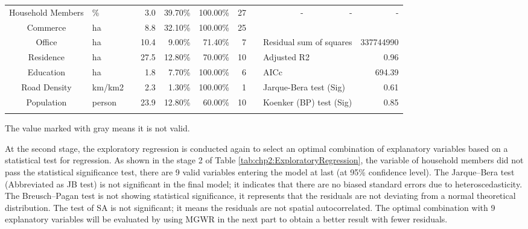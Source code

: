 \begin{sidewaystable}[htbp]
\begin{tabular}{clrrrrrcrrr}
		Household Members & \% & & 3.0 & 39.70\% & 100.00\% & 27 & & - & - & - \\
		
		\cmidrule{1-2}\cmidrule{4-7}\cmidrule{9-11}
		
		Commerce & ha & & \cellcolor[rgb]{ .8,  .8,  .8}8.8 & 32.10\% & 100.00\% & 25 & & &  \\
		
		Office & ha & & \cellcolor[rgb]{ .8,  .8,  .8}10.4 & \cellcolor[rgb]{ .8,  .8,  .8}9.00\% & \cellcolor[rgb]{ .8,  .8,  .8}71.40\% & 7 & & \multicolumn{2}{l}{Residual sum of squares} & 337744990 \\
		
		Residence & ha & & \cellcolor[rgb]{ .8,  .8,  .8}27.5 & 12.80\% & \cellcolor[rgb]{ .8,  .8,  .8}70.00\% & 10 & & \multicolumn{2}{l}{Adjusted R2} & 0.96 \\
		
		Education & ha & & 1.8 & \cellcolor[rgb]{ .8,  .8,  .8}7.70\% & 100.00\% & 6 & & \multicolumn{2}{l}{AICc} & 694.39 \\
		
		Road Density & km/km2 & & 2.3 & \cellcolor[rgb]{ .8,  .8,  .8}1.30\% & 100.00\% & 1 & & \multicolumn{2}{l}{Jarque-Bera test (Sig)} & 0.61 \\
		
		Population & person & & \cellcolor[rgb]{ .8,  .8,  .8}23.9 & 12.80\% & \cellcolor[rgb]{ .8,  .8,  .8}60.00\% & 10 & & \multicolumn{2}{l}{Koenker (BP) test (Sig)} & 0.85 \\
		
		\Xhline{1.5pt}
	\end{tabular}%
	\normalsize
	\begin{description}
		\label{note:tab:chp2:ExploratoryRegression}
		\item[Note:]
		The value marked with gray means it is not valid.
	\end{description}
\end{sidewaystable}%

%
At the second stage, the exploratory regression is conducted again to select an optimal combination of explanatory variables based on a statistical test for regression. As shown in the stage 2 of Table \ref{tab:chp2:ExploratoryRegression}, the variable of household members did not pass the statistical significance test, there are 9 valid variables entering the model at last (at 95\% confidence level). The Jarque–Bera test (Abbreviated as JB test) is not significant in the final model; it indicates that there are no biased standard errors due to heteroscedasticity. The Breusch–Pagan test is not showing statistical significance, it represents that the residuals are not deviating from a normal theoretical distribution. The test of SA is not significant; it means the residuals are not spatial autocorrelated. The optimal combination with 9 explanatory variables will be evaluated by using MGWR in the next part to obtain a better result with fewer residuals.

